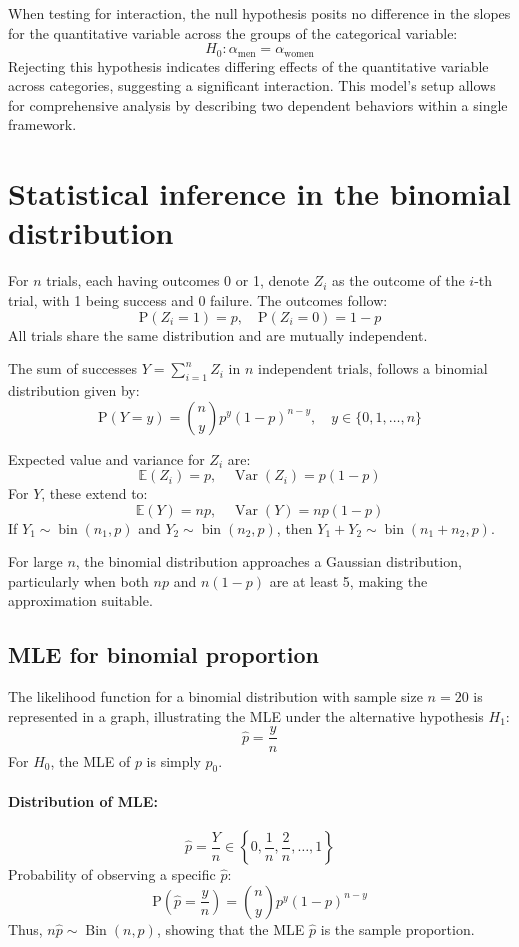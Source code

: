 \documentclass{article}
\begin{document}
When testing for interaction, the null hypothesis posits no difference in the slopes for the quantitative variable across the groups of the categorical variable:
\[
H_0: \alpha_{\text{men}} = \alpha_{\text{women}}
\]
Rejecting this hypothesis indicates differing effects of the quantitative variable across categories, suggesting a significant interaction. This model's setup allows for comprehensive analysis by describing two dependent behaviors within a single framework.

\section{Statistical inference in the binomial distribution}

For $n$ trials, each having outcomes 0 or 1, denote $Z_{i}$ as the outcome of the $i$-th trial, with 1 being success and 0 failure. The outcomes follow:
\[
\mathrm{P}(Z_{i} = 1) = p, \quad \mathrm{P}(Z_{i} = 0) = 1-p
\]
All trials share the same distribution and are mutually independent.

The sum of successes $Y = \sum_{i=1}^{n} Z_{i}$ in $n$ independent trials, follows a binomial distribution given by:
\[
\mathrm{P}(Y = y) = \binom{n}{y} p^{y} (1-p)^{n-y}, \quad y \in \{0,1, \ldots, n\}
\]

Expected value and variance for $Z_i$ are:
\[
\mathbb{E}(Z_{i}) = p, \quad \operatorname{Var}(Z_{i}) = p(1-p)
\]
For $Y$, these extend to:
\[
\mathbb{E}(Y) = np, \quad \operatorname{Var}(Y) = np(1-p)
\]
If $Y_1 \sim \operatorname{bin}(n_1, p)$ and $Y_2 \sim \operatorname{bin}(n_2, p)$, then $Y_1 + Y_2 \sim \operatorname{bin}(n_1 + n_2, p)$.

For large $n$, the binomial distribution approaches a Gaussian distribution, particularly when both $np$ and $n(1-p)$ are at least 5, making the approximation suitable.

\subsection{MLE for binomial proportion}

The likelihood function for a binomial distribution with sample size $n=20$ is represented in a graph, illustrating the MLE under the alternative hypothesis $H_1$:
\[
\hat{p} = \frac{y}{n}
\]
For $H_0$, the MLE of $p$ is simply $p_0$.

\paragraph{Distribution of MLE:}
\[
\hat{p} = \frac{Y}{n} \in \left\{0, \frac{1}{n}, \frac{2}{n}, \ldots, 1\right\}
\]
Probability of observing a specific $\hat{p}$:
\[
\mathrm{P}\left(\hat{p} = \frac{y}{n}\right) = \binom{n}{y} p^y (1-p)^{n-y}
\]
Thus, $n\hat{p} \sim \operatorname{Bin}(n, p)$, showing that the MLE $\hat{p}$ is the sample proportion.
\end{document}
